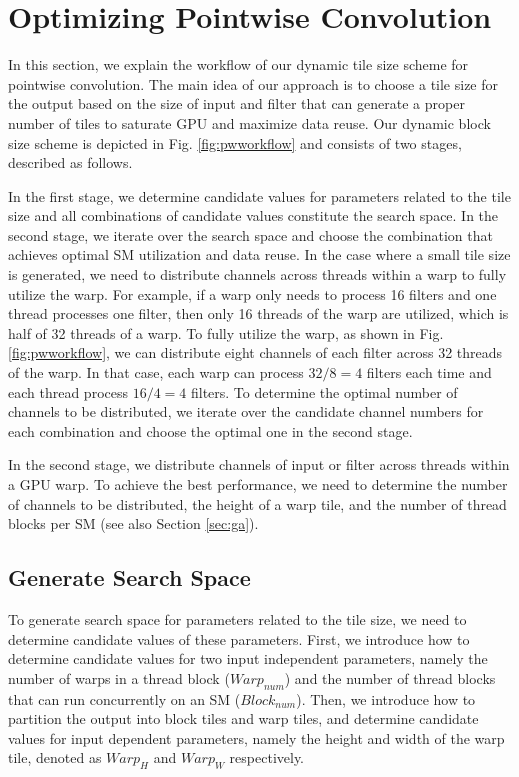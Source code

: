 \section{Optimizing Pointwise Convolution}
\label{sec:pwconv} In this section, we explain the workflow of our dynamic tile size scheme for pointwise convolution.
The main idea of our approach is to choose a tile size for the output based on the size of input and filter that can generate a proper number of tiles to saturate GPU and maximize data reuse.
 Our dynamic block size scheme is
depicted in Fig. \ref{fig:pwworkflow} and consists of two stages, described as follows.

In the first stage, we determine candidate values for parameters related to the tile size and all combinations of candidate values constitute the search space. In the second stage, we iterate over the search space and choose the combination that achieves optimal SM utilization and data reuse. In the case where a small tile size is generated, we need to distribute channels across threads within a warp to fully utilize the warp. For example, if a warp only needs to process 16 filters and one thread processes one filter, then only 16 threads of the warp are utilized, which is half of 32 threads of a warp. To fully utilize the warp, as shown in Fig. \ref{fig:pwworkflow}, we can distribute eight channels of each filter across 32 threads of the warp. In that case, each warp can process $32/8=4$ filters each time and each thread process $16/4=4$ filters. To determine the optimal number of channels to be distributed, we iterate over the candidate channel numbers for each combination and choose the optimal one in the second stage.  

 In the second stage, we distribute channels of input or filter across threads
within a GPU warp. To achieve the best performance, we need to determine the number of channels to be distributed, the height of a warp
tile, and the number of thread blocks per SM (see also Section \ref{sec:ga}).

\subsection{Generate Search Space}
To generate search space for parameters related to the tile size, we need to determine candidate values of these parameters. First, we introduce how to determine candidate values for two input independent parameters, namely the number of warps in a thread block ($Warp_{num}$) and the number of thread blocks that can run concurrently on an SM ($Block_{num}$). Then, we introduce how to partition the output into block tiles and warp tiles, and determine candidate values for input dependent parameters, namely the height and width of the warp  tile, denoted as $Warp_H$ and $Warp_W$ respectively.

